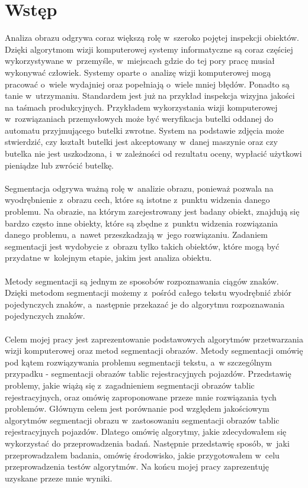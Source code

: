 \section{Wstęp}
Analiza obrazu odgrywa coraz większą rolę w~szeroko pojętej inspekcji obiektów. Dzięki algorytmom wizji komputerowej systemy informatyczne są coraz częściej wykorzystywane w~przemyśle, w~miejscach gdzie do tej pory pracę musiał wykonywać człowiek. Systemy oparte o~analizę wizji komputerowej mogą pracować o~wiele wydajniej oraz popełniają o~wiele mniej błędów. Ponadto są tanie w~utrzymaniu. Standardem jest już na przykład inspekcja wizyjna jakości na taśmach produkcyjnych. Przykładem wykorzystania wizji komputerowej w~rozwiązaniach przemysłowych może być weryfikacja butelki oddanej do automatu przyjmującego butelki zwrotne. System na podstawie zdjęcia może stwierdzić, czy kształt butelki jest akceptowany w~danej maszynie oraz czy butelka nie jest uszkodzona, i~w zależności od rezultatu oceny, wypłacić użytkowi pieniądze lub zwrócić butelkę.
\paragraph{}
Segmentacja odgrywa ważną rolę w~analizie obrazu, ponieważ pozwala na wyodrębnienie z~obrazu cech, które są istotne z~punktu widzenia danego problemu. Na obrazie, na którym zarejestrowany jest badany obiekt, znajdują się bardzo często inne obiekty, które są zbędne z~punktu widzenia rozwiązania danego problemu, a~nawet przeszkadzają w~jego rozwiązaniu. Zadaniem segmentacji jest wydobycie z~obrazu tylko takich obiektów, które mogą być przydatne w~kolejnym etapie, jakim jest analiza obiektu.
\paragraph{}
Metody segmentacji są jednym ze sposobów rozpoznawania ciągów znaków. Dzięki metodom segmentacji możemy z~pośród całego tekstu wyodrębnić zbiór pojedynczych znaków, a~następnie przekazać je do algorytmu rozpoznawania pojedynczych znaków.
\paragraph{}
Celem mojej pracy jest zaprezentowanie podstawowych algorytmów przetwarzania wizji komputerowej oraz metod segmentacji obrazów. Metody segmentacji omówię pod kątem rozwiązywania problemu segmentacji tekstu, a~w szczególnym przypadku - segmentacji obrazów tablic rejestracyjnych pojazdów. Przedstawię problemy, jakie wiążą się z~zagadnieniem segmentacji obrazów tablic rejestracyjnych, oraz omówię zaproponowane przeze mnie rozwiązania tych problemów. Głównym celem jest porównanie pod względem jakościowym algorytmów segmentacji obrazu w~zastosowaniu segmentacji obrazów tablic rejestracyjnych pojazdów. Dlatego omówię algorytmy, jakie zdecydowałem się wykorzystać do przeprowadzenia badań. Następnie przedstawię sposób, w~jaki przeprowadzałem badania, omówię środowisko, jakie przygotowałem w~celu przeprowadzenia testów algorytmów. Na końcu mojej pracy zaprezentuję uzyskane przeze mnie wyniki.

